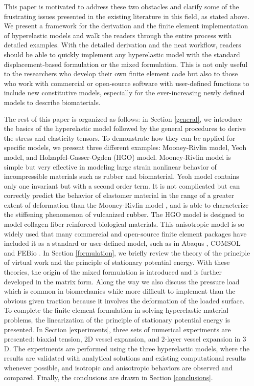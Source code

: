 This paper is motivated to address these two obstacles and clarify some of the frustrating issues presented in the existing literature in this field, as stated above. We present a framework for the derivation and the finite element implementation of hyperelastic models and walk the readers through the entire process with detailed examples. With the detailed derivation and the neat workflow, readers should be able to quickly implement any hyperelastic model with the standard displacement-based formulation or the mixed formulation. This is not only useful to the researchers who develop their own finite element code but also to those who work with commercial or open-source software with user-defined functions to include new constitutive models, especially for the ever-increasing newly defined models to describe biomaterials.

The rest of this paper is organized as follows: in Section \ref{general}, we introduce the basics of the hyperelastic model followed by the general procedures to derive the stress and elasticity tensors. To demonstrate how they can be applied for specific models, we present three different examples: Mooney-Rivlin model, Yeoh model, and Holzapfel-Gasser-Ogden (HGO) model. Mooney-Rivlin model is simple but very effective in modeling large strain nonlinear behavior of incompressible materials such as rubber and biomaterial. Yeoh model contains only one invariant but with a second order term. It is not complicated but can correctly predict the behavior of elastomer material in the range of a greater extent of deformation than the Mooney-Rivlin model \cite{Gajewski}, and is able to characterize the stiffening phenomenon of vulcanized rubber. The HGO model is designed to model collagen fiber-reinforced biological materials. This anisotropic model is so widely used that many commercial and open-source finite element packages have included it as a standard or user-defined model,  such as in Abaqus \cite{Abaqus}, COMSOL \cite{COMSOL} and FEBio \cite{FEBio}. In Section \ref{formulation}, we briefly review the theory of the principle of virtual work and the principle of stationary potential energy. With these theories, the origin of the mixed formulation is introduced and is further developed in the matrix form. Along the way we also discuss the pressure load which is common in biomechanics while more difficult to implement than the obvious given traction because it involves the deformation of the loaded surface. To complete the finite element formulation in solving hyperelastic material problems, the linearization of the principle of stationary potential energy is presented. In Section \ref{experiments}, three sets of numerical experiments are presented: biaxial tension, $2$D vessel expansion, and $2$-layer vessel expansion in $3$D. The experiments are performed using the three hyperelastic models, where the results are validated with analytical solutions and existing computational results whenever possible, and isotropic and anisotropic behaviors are observed and compared. Finally, the conclusions are drawn in Section \ref{conclusions}.




 



